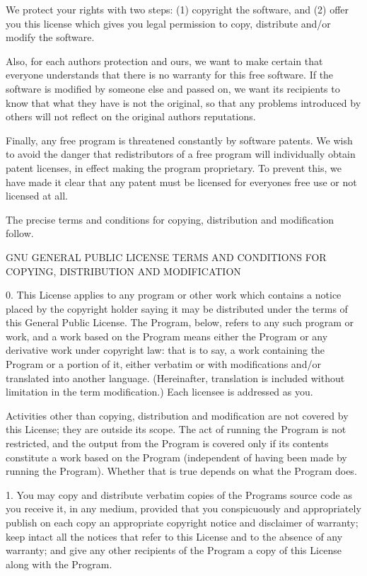 \documentclass[letterpaper,10pt,english,openany,oneside]{sphinxmanual}
\begin{document}
\begin{sphinxVerbatim}[commandchars=\\\{\}]
  We protect your rights with two steps: (1) copyright the software, and
(2) offer you this license which gives you legal permission to copy,
distribute and/or modify the software.

  Also, for each author\PYGZsq{}s protection and ours, we want to make certain
that everyone understands that there is no warranty for this free
software.  If the software is modified by someone else and passed on, we
want its recipients to know that what they have is not the original, so
that any problems introduced by others will not reflect on the original
authors\PYGZsq{} reputations.

  Finally, any free program is threatened constantly by software
patents.  We wish to avoid the danger that redistributors of a free
program will individually obtain patent licenses, in effect making the
program proprietary.  To prevent this, we have made it clear that any
patent must be licensed for everyone\PYGZsq{}s free use or not licensed at all.

  The precise terms and conditions for copying, distribution and
modification follow.

                    GNU GENERAL PUBLIC LICENSE
   TERMS AND CONDITIONS FOR COPYING, DISTRIBUTION AND MODIFICATION

  0. This License applies to any program or other work which contains
a notice placed by the copyright holder saying it may be distributed
under the terms of this General Public License.  The \PYGZdq{}Program\PYGZdq{}, below,
refers to any such program or work, and a \PYGZdq{}work based on the Program\PYGZdq{}
means either the Program or any derivative work under copyright law:
that is to say, a work containing the Program or a portion of it,
either verbatim or with modifications and/or translated into another
language.  (Hereinafter, translation is included without limitation in
the term \PYGZdq{}modification\PYGZdq{}.)  Each licensee is addressed as \PYGZdq{}you\PYGZdq{}.

Activities other than copying, distribution and modification are not
covered by this License; they are outside its scope.  The act of
running the Program is not restricted, and the output from the Program
is covered only if its contents constitute a work based on the
Program (independent of having been made by running the Program).
Whether that is true depends on what the Program does.

  1. You may copy and distribute verbatim copies of the Program\PYGZsq{}s
source code as you receive it, in any medium, provided that you
conspicuously and appropriately publish on each copy an appropriate
copyright notice and disclaimer of warranty; keep intact all the
notices that refer to this License and to the absence of any warranty;
and give any other recipients of the Program a copy of this License
along with the Program.


\end{sphinxVerbatim}
\end{document}
